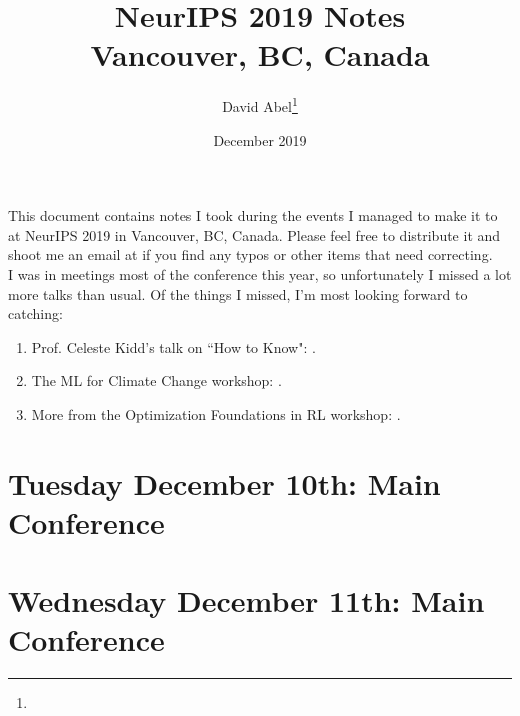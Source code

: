 \documentclass[11pt]{article}
\title{NeurIPS 2019 Notes \\ \Large{Vancouver, BC, Canada}}
\author{David Abel\footnote{\durl{http://david-abel.github.io}} \\ \durl{david_abel@brown.edu}}
\date{December 2019}
\begin{document}
\maketitle
\tableofcontents
\newpage


This document contains notes I took during the events I managed to make it to at NeurIPS 2019 in Vancouver, BC, Canada. Please feel free to distribute it and shoot me an email at  if you find any typos or other items that need correcting. \\

I was in meetings most of the conference this year, so unfortunately I missed a lot more talks than usual. Of the things I missed, I'm most looking forward to catching:
\begin{enumerate}
    \item Prof. Celeste Kidd's talk on ``How to Know": .
    \item The ML for Climate Change workshop: .
    \item More from the Optimization Foundations in RL workshop: .
\end{enumerate}










% 



\newpage
\section{Tuesday December 10th: Main Conference}




\newpage
\section{Wednesday December 11th: Main Conference}

\end{document}
